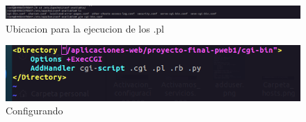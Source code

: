 \begin{figure}[H]
  \centering
  \includegraphics[width=1.0\textwidth]{img/Ubicacion_ejecucion.png}
  \caption{Ubicacion para la ejecucion de los .pl}
\end{figure}
\begin{figure}[H]
  \centering
  \includegraphics[width=1.0\textwidth]{img/Configurando.png}
  \caption{Configurando}
\end{figure}

